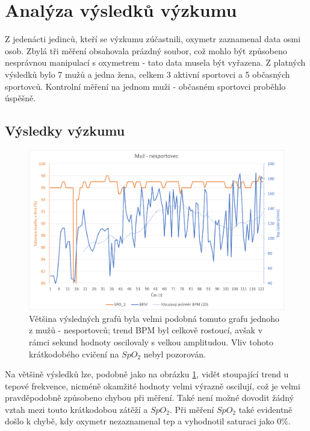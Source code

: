 \section{Analýza výsledků výzkumu}
Z jedenácti jedinců, kteří se výzkumu zúčastnili, oxymetr zaznamenal data osmi osob. Zbylá tři měření obsahovala prázdný soubor, což mohlo být způsobeno nesprávnou manipulací s oxymetrem - tato data musela být vyřazena. Z platných výsledků bylo 7 mužů a jedna žena, celkem 3 aktivní sportovci a 5 občasných sportovců. Kontrolní měření na jednom muži - občasném sportovci proběhlo úspěšně.
\subsection{Výsledky výzkumu}
\begin{figure}[ht]
\centering
  \includegraphics[scale=0.55, center]{Kapitoly/Prakticka/Obrazky/SpatnyGraf.png}
  \caption [Graf typického muže - nesportovce]{Většina výsledných grafů byla velmi podobná tomuto grafu jednoho z mužů - nesportovců; trend BPM byl celkově rostoucí, avšak v rámci sekund hodnoty oscilovaly s velkou amplitudou. Vliv tohoto krátkodobého cvičení na $SpO_2$ nebyl pozorován.}
  \label{fig:Spatny}
\end{figure}
Na většině výsledků lze, podobně jako na obrázku \ref{fig:Spatny}, vidět stoupající trend u tepové frekvence, nicméně okamžité hodnoty velmi výrazně oscilují, což je velmi pravděpodobně způsobeno chybou při měření. Také není možné dovodit žádný vztah mezi touto krátkodobou zátěží a $SpO_2$. Při měření $SpO_2$ také evidentně došlo k chybě, kdy oxymetr nezaznamenal tep a vyhodnotil saturaci jako 0\%.
